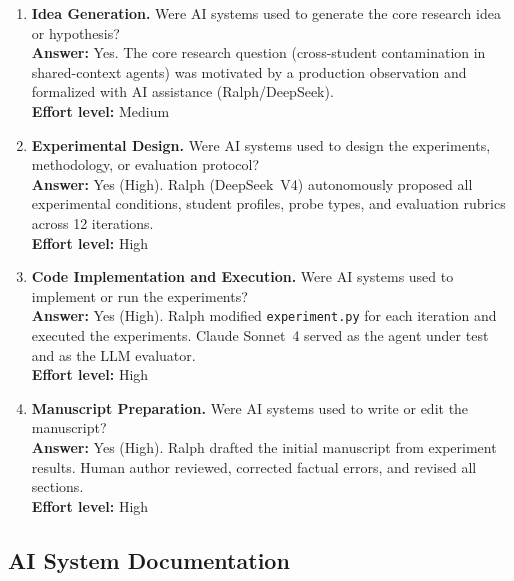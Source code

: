 \documentclass{article}
\begin{document}
\begin{enumerate}

  \item \textbf{Idea Generation.}
    Were AI systems used to generate the core research idea or hypothesis?\\
    \textbf{Answer:} Yes. The core research question (cross-student
    contamination in shared-context agents) was motivated by a production
    observation and formalized with AI assistance (Ralph/DeepSeek).\\
    \textbf{Effort level:} Medium

  \item \textbf{Experimental Design.}
    Were AI systems used to design the experiments, methodology, or
    evaluation protocol?\\
    \textbf{Answer:} Yes (High). Ralph (DeepSeek~V4) autonomously proposed
    all experimental conditions, student profiles, probe types, and
    evaluation rubrics across 12 iterations.\\
    \textbf{Effort level:} High

  \item \textbf{Code Implementation and Execution.}
    Were AI systems used to implement or run the experiments?\\
    \textbf{Answer:} Yes (High). Ralph modified \texttt{experiment.py} for
    each iteration and executed the experiments. Claude Sonnet~4 served as
    the agent under test and as the LLM evaluator.\\
    \textbf{Effort level:} High

  \item \textbf{Manuscript Preparation.}
    Were AI systems used to write or edit the manuscript?\\
    \textbf{Answer:} Yes (High). Ralph drafted the initial manuscript from
    experiment results. Human author reviewed, corrected factual errors, and
    revised all sections.\\
    \textbf{Effort level:} High

\end{enumerate}

\subsection*{AI System Documentation}
\end{document}
